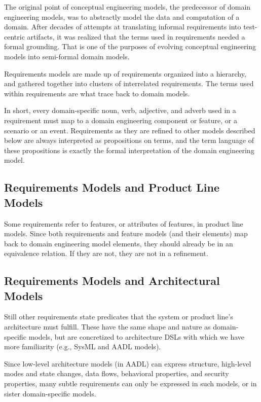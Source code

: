 \documentclass[10pt,letterpaper]{article}
\begin{document}
The original point of conceptual engineering models, the predecessor of domain engineering models, was to abstractly model the data and computation of a domain. After decades of attempts at translating informal requirements into test-centric artifacts, it was realized that the terms used in requirements needed a formal grounding. That is one of the purposes of evolving conceptual engineering models into semi-formal domain models.

Requirements models are made up of requirements organized into a hierarchy, and gathered together into clusters of interrelated requirements. The terms used within requirements are what trace back to domain models.

In short, every domain-specific noun, verb, adjective, and adverb used in a requirement must map to a domain engineering component or feature, or a scenario or an event. Requirements as they are refined to other models described below are always interpreted as propositions on terms, and the term language of these propositions is exactly the formal interpretation of the domain engineering model.

\subsection{Requirements Models and Product Line Models}
\label{requirements-models-and-product-line-models}

Some requirements refer to features, or attributes of features, in product line models. Since both requirements and feature models (and their elements) map back to domain engineering model elements, they should already be in an equivalence relation. If they are not, they are not in a refinement.

\subsection{Requirements Models and Architectural Models}
\label{requirements-models-and-architectural-models}

Still other requirements state predicates that the system or product line's architecture must fulfill. These have the same shape and nature as domain-specific models, but are concretized to architecture DSLs with which we have more familiarity (e.g., SysML and AADL models).

Since low-level architecture models (in AADL) can express structure, high-level modes and state changes, data flows, behavioral properties, and security properties, many subtle requirements can only be expressed in such models, or in sister domain-specific models.
\end{document}
